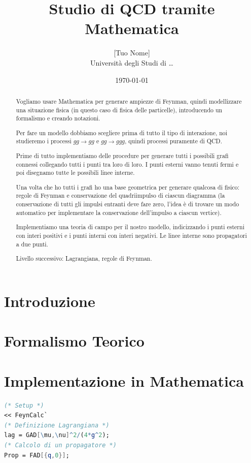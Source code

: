 \documentclass[11pt,a4paper]{article}
\title{\textbf{Studio di QCD tramite Mathematica}}
\author{[Tuo Nome] \\ \small Università degli Studi di …}
\date{\today}
\begin{document}
\maketitle

\begin{abstract}
  Vogliamo usare Mathematica per generare ampiezze di Feynman, quindi modellizzare una situazione fisica (in questo caso di fisica delle particelle), introducendo un formalismo e creando notazioni.

  Per fare un modello dobbiamo scegliere prima di tutto il tipo di interazione, noi studieremo i processi $gg \rightarrow gg$ e $gg \rightarrow ggg$, quindi processi puramente di QCD.

  Prime di tutto implementiamo delle procedure per generare tutti i possibili grafi connessi collegando tutti i punti tra loro di loro. I punti esterni vanno tenuti fermi e poi disegnamo tutte le possibili linee interne.

  Una volta che ho tutti i grafi ho una base geometrica per generare qualcosa di fisico: regole di Feynman e conservazione del quadriimpulso di ciascun diagramma (la conservazione di tutti gli impulsi entranti deve fare zero, l'idea è di trovare un modo automatico per implementare la conservazione dell'impulso a ciascun vertice).

  Implementiamo una teoria di campo per il nostro modello, indicizzando i punti esterni con interi positivi e i punti interni con interi negativi. Le linee interne sono propagatori a due punti.

  Livello successivo: Lagrangiana, regole di Feynman.

\end{abstract}

\section{Introduzione}

\section{Formalismo Teorico}

\section{Implementazione in Mathematica}
\begin{lstlisting}[language=Mathematica,caption={Esempio di calcolo con FeynCalc}]
(* Setup *)
<< FeynCalc`
(* Definizione Lagrangiana *)
lag = GAD[\mu,\nu]^2/(4*g^2);
(* Calcolo di un propagatore *)
Prop = FAD[{q,0}];
\end{lstlisting}
\end{document}
